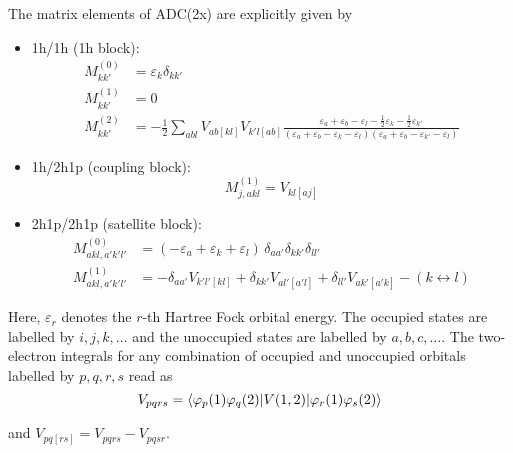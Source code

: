 The matrix elements of ADC(2x) are explicitly given by
\begin{itemize}
 \item 1h/1h (1h block):
   \begin{align}
    M_{kk'}^{(0)} &= \varepsilon_k \delta_{kk'} \\
    M_{kk'}^{(1)} &= 0 \\
    M_{kk'}^{(2)} &= -\frac12 \sum\limits_{abl} V_{ab[kl]} V_{k'l[ab]} %
                     \frac{\varepsilon_a+\varepsilon_b-\varepsilon_l
                       -\frac12 \varepsilon_k-\frac12 \varepsilon_{k'}}
                     {(\varepsilon_a+\varepsilon_b-\varepsilon_k-\varepsilon_l)
                      (\varepsilon_a+\varepsilon_b-\varepsilon_{k'}-\varepsilon_l)}
   \end{align}
 \item 1h/2h1p (coupling block):
   \begin{equation}
    M_{j,akl}^{(1)} = V_{kl[aj]}
   \end{equation}
 \item 2h1p/2h1p (satellite block):
   \begin{align}
    M_{akl,a'k'l'}^{(0)} &= (-\varepsilon_a+\varepsilon_k+\varepsilon_l)
                             \, \delta_{aa'}\delta_{kk'}\delta_{ll'} \\
    M_{akl,a'k'l'}^{(1)} &= -\delta_{aa'} V_{k'l'[kl]} + \delta_{kk'} V_{al'[a'l]}
                            +\delta_{ll'} V_{ak'[a'k]} - (k \leftrightarrow l)
   \end{align}
\end{itemize}

Here, $\varepsilon_r$ denotes the $r$-th Hartree Fock orbital energy.
The occupied states are labelled
by $i,j,k,\dots$ and the unoccupied states are labelled by $a,b,c,\dots$. The
two-electron integrals for any combination of occupied and unoccupied orbitals
labelled by $p,q,r,s$ read as
\begin{equation}
 V_{pqrs} = \braket{\varphi_p(1)\varphi_q(2) |V(1,2)| \varphi_r(1)\varphi_s(2)}
\end{equation}

and $V_{pq[rs]} = V_{pqrs} - V_{pqsr}$.

